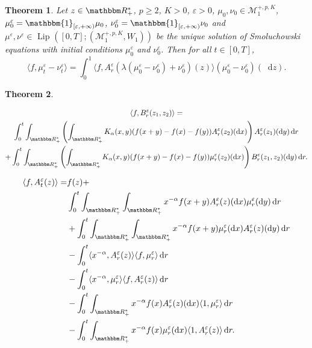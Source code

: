 \documentclass[a4paper,11pt, reqno]{amsart}
\newcommand{\cM}{\mathcal{M}}	\newcommand{\MM}{\mathbbm{M}}
\newcommand{\eps}{\varepsilon}
\newcommand{\dd}{\mathop{}\!\mathrm{d}}
\newcommand{\red}[1]{{\color{red} #1}}
\newcommand{\1}{\mathbbm{1}}
\theoremstyle{plain}
\newtheorem{theorem}{Theorem}[section]
\theoremstyle{definition}
\begin{document}
\begin{theorem}
  \red{Let $z \in \RR_+^{\ast}$, \red{$p \ge
  2$}, $K > 0$, $\eps > 0$, $\mu_0, \nu_0 \in \cM^{+, p, K}_1$,
  $\mu_0^{\eps} = \mathbbm{1}_{[\eps, + \infty)} \mu_0$,
  $\nu_0^{\eps} = \mathbbm{1}_{[\eps, + \infty)} \nu_0$ and
  $\mu^{\eps}, \nu^{\eps} \in  \text{ Lip } ([0, T] ;
  (\cM^{+, p, K}_1, W_1))$ be the unique solution of Smoluchowski
  equations with initial conditions $\mu^{\eps}_0$ and
  $\nu^{\eps}_0$. Then for all $t \in [0, T]$,
  \[ \langle f, \mu^{\eps}_t - \nu^{\eps}_t \rangle = \int_0^1
     \langle f, A^{\eps}_r (\lambda (\mu^{\eps}_0 -
     \nu^{\eps}_0) + \nu^{\eps}_0) (z) \rangle
     (\mu^{\eps}_0 - \nu^{\eps}_0) (\dd z) . \]}
\end{theorem}

\begin{theorem}
  \
  
  \begin{multline*}
    \langle f, B^{\eps}_r (z_1, z_2) \rangle =\\
    \int_0^t \int_{\RR_+^{\ast}} \left( \int_{\RR_+^{\ast}}
    K_{\alpha} (x, y) (f (x + y) - f (x) - f (y)) A^{\eps}_r (z_2)
    (\dd x) \right) A^{\eps}_r (z_1) (\dd y) \dd r\\
    + \int_0^t \int_{\RR_+^{\ast}} \left( \int_{\RR_+^{\ast}}
    K_{\alpha} (x, y) (f (x + y) - f (x) - f (y)) \mu^{\eps}_r (z_2)
    (\dd x) \right) B^{\eps}_r (z_1, z_2) (\dd y) \dd r.
  \end{multline*}
\end{theorem}

\begin{align*}
  \langle f, A_t^{\eps} (z) \rangle = & f (z) +\\
  & \int_0^t \int_{\RR^{\ast}_+} \int_{\RR^{\ast}_+} x^{-
  \alpha} f (x + y) A_r^{\eps} (z) (\dd x) \mu_r^{\eps}
  (\dd y) \dd r\\
  & + \int_0^t \int_{\RR^{\ast}_+} \int_{\RR^{\ast}_+} x^{-
  \alpha} f (x + y) \mu_r^{\eps} (\dd x) A^{\eps}_r (z)
  (\dd y) \dd r\\
  & - \int_0^t \langle x^{- \alpha}, A^{\eps}_r (z) \rangle \langle f,
  \mu_r^{\eps} \rangle \dd r\\
  & - \int_0^t \langle x^{- \alpha}, \mu^{\eps}_r \rangle \langle f,
  A^{\eps}_r (z) \rangle \dd r\\
  & - \int_0^t \int_{\RR^{\ast}_+} x^{- \alpha} f (x)
  A^{\eps}_r (z) (\dd x) \langle 1, \mu_r^{\eps} \rangle
  \dd r\\
  & - \int_0^t \int_{\RR^{\ast}_+} x^{- \alpha} f (x)
  \mu_r^{\eps} (\dd x) \langle 1, A^{\eps}_r (z) \rangle
  \dd r.
\end{align*}
\end{document}
